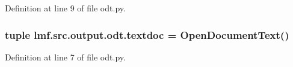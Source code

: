 Definition at line 9 of file odt.\+py.

\hypertarget{namespacelmf_1_1src_1_1output_1_1odt_acfe673df400456dbafa6cf3b26a788bd}{
\subsubsection[{textdoc}]{\setlength{\rightskip}{0pt plus 5cm}tuple lmf.\+src.\+output.\+odt.\+textdoc = Open\+Document\+Text()}}\label{namespacelmf_1_1src_1_1output_1_1odt_acfe673df400456dbafa6cf3b26a788bd}


Definition at line 7 of file odt.\+py.

